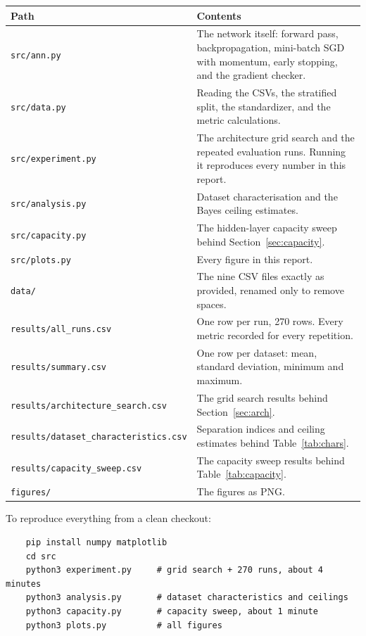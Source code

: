 \documentclass[11pt]{article}
\begin{document}
\begin{table}[H]
\centering
\small
\begin{tabular}{p{4.6cm}p{9.9cm}}
\toprule
\textbf{Path} & \textbf{Contents} \\
\midrule
\texttt{src/ann.py} &
The network itself: forward pass, backpropagation, mini-batch SGD with
momentum, early stopping, and the gradient checker. \\
\texttt{src/data.py} &
Reading the CSVs, the stratified split, the standardizer, and the metric
calculations. \\
\texttt{src/experiment.py} &
The architecture grid search and the repeated evaluation runs. Running it
reproduces every number in this report. \\
\texttt{src/analysis.py} &
Dataset characterisation and the Bayes ceiling estimates. \\
\texttt{src/capacity.py} &
The hidden-layer capacity sweep behind Section~\ref{sec:capacity}. \\
\texttt{src/plots.py} &
Every figure in this report. \\
\texttt{data/} &
The nine CSV files exactly as provided, renamed only to remove spaces. \\
\texttt{results/all\_runs.csv} &
One row per run, 270 rows. Every metric recorded for every repetition. \\
\texttt{results/summary.csv} &
One row per dataset: mean, standard deviation, minimum and maximum. \\
\texttt{results/architecture\_search.csv} &
The grid search results behind Section~\ref{sec:arch}. \\
\texttt{results/dataset\_characteristics.csv} &
Separation indices and ceiling estimates behind Table~\ref{tab:chars}. \\
\texttt{results/capacity\_sweep.csv} &
The capacity sweep results behind Table~\ref{tab:capacity}. \\
\texttt{figures/} &
The figures as PNG. \\
\bottomrule
\end{tabular}
\end{table}

To reproduce everything from a clean checkout:
\begin{verbatim}
    pip install numpy matplotlib
    cd src
    python3 experiment.py     # grid search + 270 runs, about 4 minutes
    python3 analysis.py       # dataset characteristics and ceilings
    python3 capacity.py       # capacity sweep, about 1 minute
    python3 plots.py          # all figures
\end{verbatim}
\end{document}
